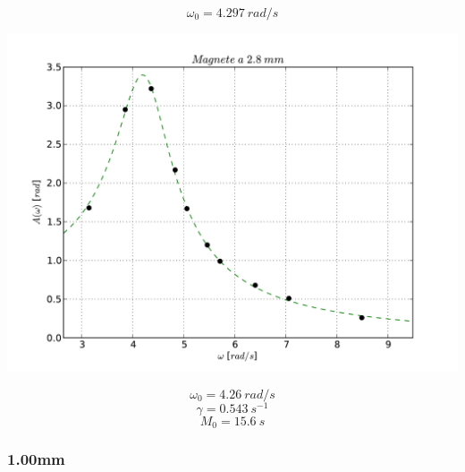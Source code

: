 $$\omega_{0} = 4.297\ rad/s$$
\begin{center}
\includegraphics[scale=0.75]{"../grafici/Magnetea28mm"}

$$ \omega_0 = 4.26\ rad/s $$
$$ \gamma = 0.543\ s^{-1} $$
$$ M_0 = 15.6\ s$$

\end{center}


\subsubsection{1.00mm}

